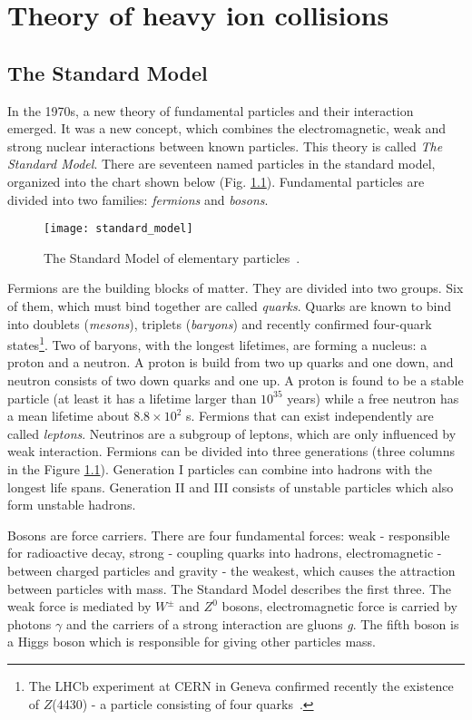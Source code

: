 \chapter{Theory of heavy ion collisions}
  \section{The Standard Model}
    In the 1970s, a new theory of fundamental particles and their interaction emerged.
    It was a new concept, which combines the electromagnetic, weak and strong nuclear interactions between known particles.
    This theory is called \textit{The Standard Model}.
    There are seventeen named particles in the standard model, organized into the chart shown below (Fig. \ref{fig:standard_model}).
    Fundamental particles are divided into two families: \textit{fermions} and \textit{bosons}.
     \begin{figure}[h]
       \centering
       \texttt{[image: standard\_model]}
       \caption{The Standard Model of elementary particles~\cite{sm_svg}.}
       \label{fig:standard_model}
     \end{figure}
     
    Fermions are the building blocks of matter.
    They are divided into two groups.
    Six of them, which must bind together are called \textit{quarks}.
    Quarks are known to bind into doublets (\textit{mesons}), triplets (\textit{baryons}) and recently confirmed four-quark states\footnote{The LHCb experiment at CERN in Geneva confirmed recently the existence of $Z$(4430) - a particle consisting of four quarks~\cite{fourquark}.}.
    Two of baryons, with the longest lifetimes, are forming a nucleus: a proton and a neutron.
    A proton is build from two up quarks and one down, and neutron consists of two down quarks and one up.
    A proton is found to be a stable particle (at least it has a lifetime larger than $10^{35}$ years) while a free neutron has a mean lifetime about $8.8\times10^2$ s.
    Fermions that can exist independently are called \textit{leptons}.
    Neutrinos are a subgroup of leptons, which are only influenced by weak interaction.
    Fermions can be divided into three generations (three columns in the Figure \ref{fig:standard_model}).
    Generation I particles can combine into hadrons with the longest life spans. 
    Generation II and III consists of unstable particles which also form unstable hadrons. 
    
    Bosons are force carriers.
    There are four fundamental forces: weak - responsible for radioactive decay, strong - coupling quarks into hadrons, electromagnetic - between charged particles and gravity - the weakest, which causes the attraction between particles with mass.
    The Standard Model describes the first three.
    The weak force is mediated by $W^{\pm}$ and $Z^0$ bosons, electromagnetic force is carried by photons $\gamma$ and the carriers of a strong interaction are gluons \textit{g}.
    The fifth boson is a Higgs boson which is responsible for giving other particles mass. 
 
